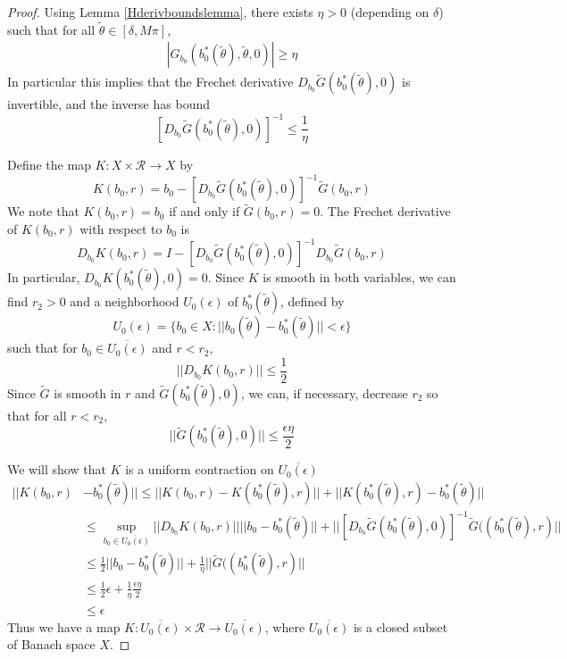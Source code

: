 \documentclass[thesis.tex]{subfiles}
\begin{document}
\begin{lemma}
\begin{proof}
Using Lemma \ref{Hderivboundslemma}, there exists $\eta > 0$ (depending on $\delta$) such that for all $\tilde{\theta} \in [\delta, M \pi]$,
\begin{align*}
|G_{b_0}( b_0^*(\tilde{\theta}), \tilde{\theta}, 0)| \geq \eta 
\end{align*}
In particular this implies that the Frechet derivative $D_{b_0} \tilde{G}(b_0^*(\tilde{\theta}), 0)$ is invertible, and the inverse has bound
\[
[D_{b_0} \tilde{G}(b_0^*(\tilde{\theta}), 0)]^{-1} \leq \frac{1}{\eta}
\]

Define the map $K: X \times \mathcal{R} \rightarrow X$ by
\begin{equation}\label{defKb0}
K(b_0, r) = b_0 - [D_{b_0} \tilde{G}(b_0^*(\tilde{\theta}), 0)]^{-1} \tilde{G}(b_0, r)
\end{equation}
We note that $K(b_0, r) = b_0$ if and only if $\tilde{G}(b_0, r) = 0$. The Frechet derivative of $K(b_0, r)$ with respect to $b_0$ is 
\begin{equation}\label{DKb0}
D_{b_0} K(b_0, r) = I - [D_{b_0} \tilde{G}(b_0^*(\tilde{\theta}), 0)]^{-1} D_{b_0} \tilde{G}(b_0, r)
\end{equation}
In particular, $D_{b_0} K(b_0^*(\tilde{\theta}), 0) = 0$. Since $K$ is smooth in both variables, we can find $r_2 > 0$ and a neighborhood $U_0(\epsilon)$ of $b_0^*(\tilde{\theta})$, defined by
\[
U_0(\epsilon) = \{ b_0 \in X : ||b_0(\tilde{\theta}) -  b_0^*(\tilde{\theta})|| < \epsilon \}
\]
such that for $b_0 \in \overline{U_0(\epsilon)}$ and $r < r_2$,
\[
||D_{b_0} K(b_0, r)|| \leq \frac{1}{2}
\]
Since $\tilde{G}$ is smooth in $r$ and $\tilde{G}(b_0^*(\tilde{\theta}), 0)$, we can, if necessary, decrease $r_2$ so that for all $r < r_2$,
\[
||\tilde{G}(b_0^*(\tilde{\theta}), 0)|| \leq \frac{\epsilon \eta}{2}
\]

We will show that $K$ is a uniform contraction on $\overline{U_0(\epsilon)}$
\begin{align*}
|| K(b_0, r) &- b_0^*(\tilde{\theta}) || \leq 
|| K(b_0, r) - K(b_0^*(\tilde{\theta}), r) || + 
|| K(b_0^*(\tilde{\theta}), r) - b_0^*(\tilde{\theta}) || \\
&\leq \sup_{b_0 \in \overline{U_0(\epsilon)}}||D_{b_0} K(b_0, r)|| ||b_0 - b_0^*(\tilde{\theta})|| + ||[D_{b_0} \tilde{G}(b_0^*(\tilde{\theta}), 0)]^{-1} \tilde{G}((b_0^*(\tilde{\theta}), r)|| \\
&\leq \frac{1}{2}||b_0 - b_0^*(\tilde{\theta})|| + \frac{1}{\eta}||\tilde{G}((b_0^*(\tilde{\theta}), r)|| \\
&\leq \frac{1}{2}\epsilon + \frac{1}{\eta}\frac{\epsilon \eta}{2} \\
&\leq \epsilon
\end{align*}
Thus we have a map $K: \overline{U_0(\epsilon)} \times \mathcal{R} \rightarrow \overline{U_0(\epsilon)}$, where $\overline{U_0(\epsilon)}$ is a closed subset of Banach space $X$.


\end{proof}
\end{lemma}
\end{document}
